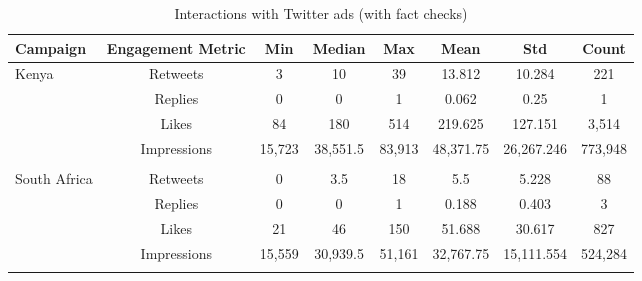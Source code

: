 \begin{table}[h!]
\centering
\caption{Interactions with Twitter ads (with fact checks)}
\label{tab:ads_fc}
\begin{tabular}{lccccccc}
  \hline
 \bfseries{Campaign} & \bfseries{Engagement Metric} & \bfseries{Min} & \bfseries{Median} & \bfseries{Max} & \bfseries{Mean} & \bfseries{Std} & \bfseries{Count} \\ 
  \hline
  Kenya & Retweets & 3 & 10 & 39 & 13.812 & 10.284 & 221 \\ 
 & Replies & 0 & 0 & 1 & 0.062 & 0.25 & 1\\ 
 & Likes &  84 & 180 & 514 & 219.625 & 127.151 & 3,514\\ 
 & Impressions &  15,723 & 38,551.5 & 83,913 & 48,371.75 & 26,267.246 & 773,948\\
 \hline \\[-1.8ex] 
 South Africa & Retweets & 0 & 3.5 & 18 & 5.5 & 5.228 & 88 \\ 
 & Replies & 0 & 0 & 1  & 0.188 & 0.403 & 3\\ 
 & Likes &  21 & 46 & 150 & 51.688 & 30.617 & 827\\ 
 & Impressions & 15,559 & 30,939.5 & 51,161 & 32,767.75 & 15,111.554 & 524,284\\
   \hline\\

\end{tabular}
\end{table}


